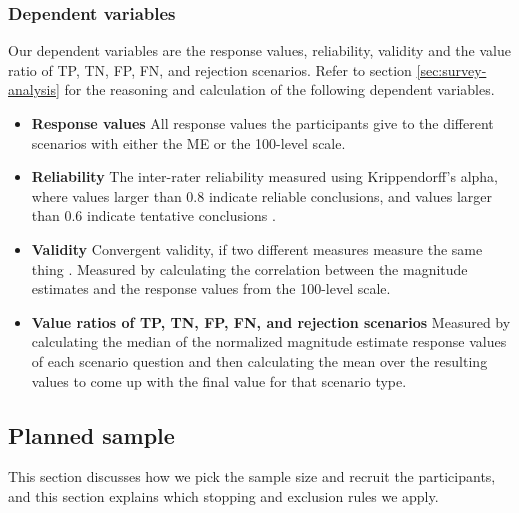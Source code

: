\subsubsection{Dependent variables}
Our dependent variables are the response values, reliability, validity and the value ratio of TP, TN, FP, FN, and rejection scenarios.
%
Refer to section \ref{sec:survey-analysis} for the reasoning and calculation of the following dependent variables.
%
\begin{itemize}
    \item \textbf{Response values} All response values the participants give to the different scenarios with either the ME or the 100-level scale.
    \item \textbf{Reliability} The inter-rater reliability measured using Krippendorff's alpha, where values larger than 0.8 indicate reliable conclusions, and values larger than 0.6 indicate tentative conclusions \citep{krippendorff2004reliability}.
    \item \textbf{Validity} Convergent validity, if two different measures measure the same thing \citep{fitzner2007reliability}. Measured by calculating the correlation between the magnitude estimates and the response values from the 100-level scale.
    \item \textbf{Value ratios of TP, TN, FP, FN, and rejection scenarios} Measured by calculating the median of the normalized magnitude estimate response values of each scenario question and then calculating the mean over the resulting values to come up with the final value for that scenario type.
\end{itemize}

\subsection{Planned sample}
This section discusses how we pick the sample size and recruit the participants, and this section explains which stopping and exclusion rules we apply.

